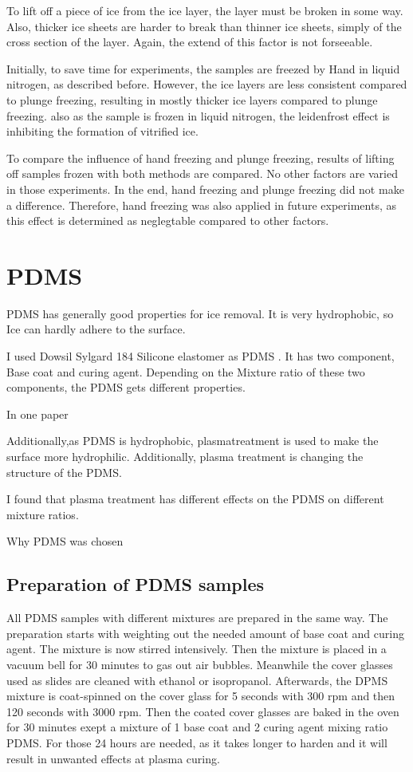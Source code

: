 To lift off a piece of ice from the ice layer, the layer must be broken in some way. Also, thicker ice sheets are harder to break than thinner ice sheets, simply of the cross section of the layer. Again, the extend of this factor is not forseeable. 

Initially, to save time for experiments, the samples are freezed by Hand in liquid nitrogen, as described before. However, the ice layers are less consistent compared to plunge freezing, resulting in mostly thicker ice layers compared to plunge freezing. also as the sample is frozen in liquid nitrogen, the leidenfrost effect is inhibiting the formation of vitrified ice. 

To compare the influence of hand freezing and plunge freezing, results of lifting off samples frozen with both methods are compared. No other factors are varied in those experiments. In the end, hand freezing and plunge freezing did not make a difference. Therefore, hand freezing was also applied in future experiments, as this effect is determined as neglegtable compared to other factors.



\section{PDMS}

PDMS has generally good properties for ice removal. It is very hydrophobic, so Ice can hardly adhere to the surface. 

I used Dowsil Sylgard 184 Silicone elastomer as PDMS \cite{DOW.}. It has two component, Base coat and curing agent. Depending on the Mixture ratio of these two components, the PDMS gets different properties. 

In one paper

Additionally,as PDMS is hydrophobic, plasmatreatment is used to make the surface more hydrophilic. Additionally, plasma treatment is changing the structure of the PDMS. 

I found that plasma treatment has different effects on the PDMS on different mixture ratios. 

Why PDMS was chosen

\subsection{Preparation of PDMS samples}

All PDMS samples with different mixtures are prepared in the same way. The preparation starts with weighting out the needed amount of base coat and curing agent. The mixture is now stirred intensively. Then the mixture is placed in a vacuum bell for 30 minutes to gas out air bubbles. Meanwhile the cover glasses used as slides are cleaned with ethanol or isopropanol. Afterwards, the DPMS mixture is coat-spinned on the cover glass for 5 seconds with 300 rpm and then 120 seconds with 3000 rpm. Then the coated cover glasses are baked in the oven for 30 minutes exept a mixture of 1 base coat and 2 curing agent mixing ratio PDMS. For those 24 hours are needed, as it takes longer to harden and it will result in unwanted effects at plasma curing.

